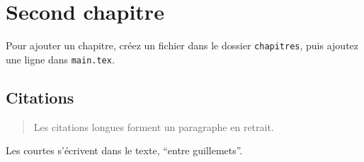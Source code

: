 \chapter{Second chapitre}
\label{chap:second}

Pour ajouter un chapitre, créez un fichier dans le dossier
\texttt{chapitres}, puis ajoutez une ligne \verb|| dans
\texttt{main.tex}.

\section{Citations}

\begin{quote}
Les citations longues forment un paragraphe en retrait.
\end{quote}

Les courtes s'écrivent dans le texte, \enquote{entre guillemets}.
